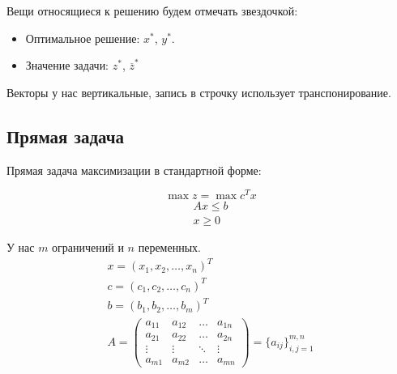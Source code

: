 \documentclass[a4paper,article,14pt]{extarticle}
\begin{document}
Вещи относящиеся к решению будем отмечать звездочкой:

\begin{itemize}
    \item Оптимальное решение: \(x^*\), \(y^*\).
    \item Значение задачи: \(z^*\), \(\overline z^*\)
\end{itemize}

Векторы у нас вертикальные, запись в строчку использует транспонирование.

\subsection{Прямая задача}

Прямая задача максимизации в стандартной форме:

\begin{equation}
    \max z = \max c^Tx
\end{equation}
\begin{gather}
    Ax \le b \\
    x \ge 0
\end{gather}



У нас \(m\) ограничений и \(n\) переменных.
\begin{gather}
    x = (x_1, x_2, \ldots, x_n)^T \\
    c = (c_1, c_2, \ldots, c_n)^T \\
    b = (b_1, b_2, \ldots, b_m)^T \\
    A =
    \begin{pmatrix}
        a_{11} & a_{12} & \ldots & a_{1n} \\
        a_{21} & a_{22} & \ldots & a_{2n} \\
        \vdots & \vdots & \ddots & \vdots \\
        a_{m1} & a_{m2} & \ldots & a_{mn}
    \end{pmatrix}
    = \{a_{ij}\}_{i,j = 1}^{m,n}
\end{gather}
\end{document}
